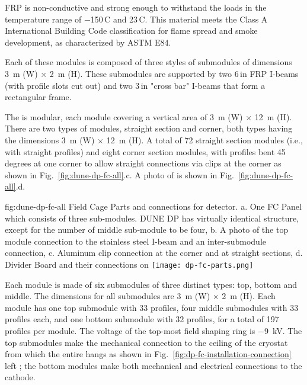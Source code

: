 FRP is non-conductive and strong enough to withstand the \fc loads in the temperature range of \num{-150}\,C and \num{23}\,C.
This material meets the  Class A International Building Code classification for flame spread and smoke development, 
as characterized by ASTM E84.   


Each of these modules is composed of three 
styles of submodules of dimensions \SI{3}{\m} (W) $\times$ \SI{2}{\m} (H). These submodules are supported by two \num{6}\,in FRP I-beams (with profile slots cut out) and two \num{3}\,in "cross bar" I-beams that form a rectangular frame.  


The \fc is modular, each module covering a vertical area of \SI{3}{\m} (W) $\times$ \SI{12}{\m} (H). 
There are two types of modules, straight section and corner, both types having the dimensions \SI{3}{\m} (W) $\times$ \SI{12}{\m} (H). A total of 72 straight section modules (i.e., with straight profiles) and eight corner section modules, with profiles bent \num{45} degrees at one corner to allow straight connections via clips at the corner as shown in Fig.~\ref{fig:dune-dp-fc-all}.c.  A photo of  \fc is shown in Fig.~\ref{fig:dune-dp-fc-all}.d.

\begin{dunefigure}[DP FC Parts]{fig:dune-dp-fc-all}
{Field Cage Parts and connections for  detector.  a. One  FC Panel which consists of three sub-modules.  DUNE DP has virtually identical structure, except for the number of middle sub-module to be four, b. A photo of the top module connection to the stainless steel I-beam and an inter-submodule connection, c. Aluminum clip connection at the corner and at straight sections, d.  Divider Board and their connections on  \fc }
\texttt{[image: dp-fc-parts.png]}
\end{dunefigure}


Each \fc module is made of six submodules of three distinct types: top, bottom and middle. The dimensions for all submodules are \SI{3}{\m} (W) $\times$ \SI{2}{\m} (H).
Each module has one top submodule with 33 profiles, four middle submodules with 33 profiles each, and one bottom submodule with 32 profiles, for a total of 197 profiles per module. The voltage of the top-most field shaping ring  is \SI{-9}{\kV}. 
The top submodules make the mechanical connection to the ceiling of the cryostat from which the entire \fc hangs as shown in Fig.~\ref{fig:dp-fc-installation-connection} left ; the bottom modules make both mechanical and electrical connections to the cathode. 


